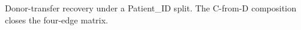 Donor-transfer recovery under a Patient\_ID split. The C-from-D composition closes the four-edge matrix.